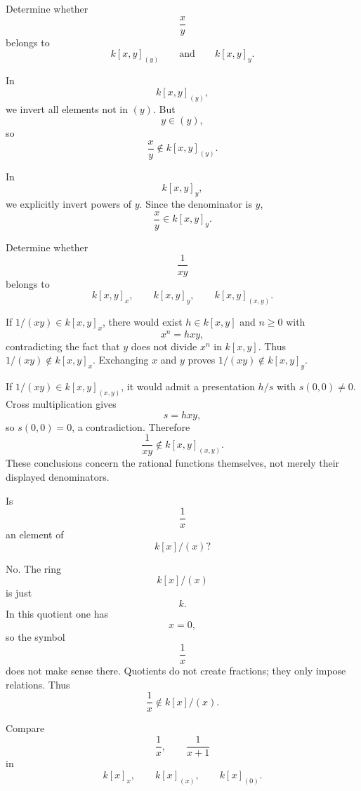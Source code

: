 \begin{problem}[CP-V-0069]
\label{prob:cp-v-0069}
Determine whether
\[
\frac{x}{y}
\]
belongs to
\[
k[x,y]_{(y)}
\qquad\text{and}\qquad
k[x,y]_y.
\]
\end{problem}

\begin{solution}
In
\[
k[x,y]_{(y)},
\]
we invert all elements not in \((y)\). But
\[
y\in (y),
\]
so
\[
\frac{x}{y}\notin k[x,y]_{(y)}.
\]

In
\[
k[x,y]_y,
\]
we explicitly invert powers of \(y\). Since the denominator is \(y\),
\[
\frac{x}{y}\in k[x,y]_y.
\]
\end{solution}


\begin{problem}[CP-V-0070]
\label{prob:cp-v-0070}
Determine whether
\[
\frac{1}{xy}
\]
belongs to
\[
k[x,y]_x,
\qquad
k[x,y]_y,
\qquad
k[x,y]_{(x,y)}.
\]
\end{problem}

\begin{solution}
If \(1/(xy)\in k[x,y]_x\), there would exist
\(h\in k[x,y]\) and \(n\ge0\) with
\[
x^n=hxy,
\]
contradicting the fact that \(y\) does not divide \(x^n\) in
\(k[x,y]\). Thus \(1/(xy)\notin k[x,y]_x\). Exchanging
\(x\) and \(y\) proves \(1/(xy)\notin k[x,y]_y\).

If \(1/(xy)\in k[x,y]_{(x,y)}\), it would admit a presentation
\(h/s\) with \(s(0,0)\ne0\). Cross multiplication gives
\[
s=hxy,
\]
so \(s(0,0)=0\), a contradiction. Therefore
\[
\frac{1}{xy}\notin k[x,y]_{(x,y)}.
\]
These conclusions concern the rational functions themselves, not
merely their displayed denominators.
\end{solution}


\begin{problem}[CP-V-0073]
\label{prob:cp-v-0073}
Is
\[
\frac{1}{x}
\]
an element of
\[
k[x]/(x)?
\]
\end{problem}

\begin{solution}
No. The ring
\[
k[x]/(x)
\]
is just
\[
k.
\]
In this quotient one has
\[
x=0,
\]
so the symbol
\[
\frac{1}{x}
\]
does not make sense there. Quotients do not create fractions; they only impose relations. Thus
\[
\frac{1}{x}\notin k[x]/(x).
\]
\end{solution}


\begin{problem}[CP-V-0074]
\label{prob:cp-v-0074}
Compare
\[
\frac{1}{x},
\qquad
\frac{1}{x+1}
\]
in
\[
k[x]_x,
\qquad
k[x]_{(x)},
\qquad
k[x]_{(0)}.
\]
\end{problem}

